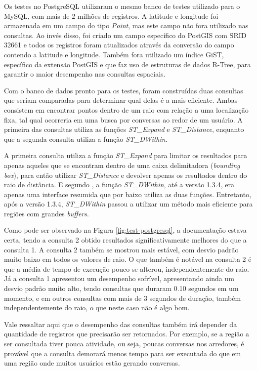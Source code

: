 \documentclass[diss]{template/setrem}
\begin{document}
Os testes no PostgreSQL utilizaram o mesmo banco de testes utilizado para o MySQL, com mais de 2 milhões de registros. A latitude e longitude foi armazenada em um campo do tipo \emph{Point}, mas este campo não fora utilizado nas consultas. Ao invés disso, foi criado um campo específico do PostGIS com SRID 32661 e todos os registros foram atualizados através da conversão do campo contendo a latitude e longitude. Também fora utilizado um índice GiST, específico da extensão PostGIS e que faz uso de estruturas de dados R-Tree, para garantir o maior desempenho nas consultas espaciais.

Com o banco de dados pronto para os testes, foram construídas duas consultas que seriam comparadas para determinar qual delas é a mais eficiente. Ambas consistem em encontrar pontos dentro de um raio com relação a uma localização fixa, tal qual ocorreria em uma busca por conversas ao redor de um usuário. A primeira das consultas utiliza as funções \emph{ST\_Expand} e \emph{ST\_Distance}, enquanto que a segunda consulta utiliza a função \emph{ST\_DWithin}.

A primeira consulta utiliza a função \emph{ST\_Expand} para limitar os resultados para apenas aqueles que se encontram dentro de uma caixa delimitadora (\emph{bounding box}), para então utilizar \emph{ST\_Distance} e devolver apenas os resultados dentro do raio de distância. E segundo \citet{PostGIS2012a}, a função \emph{ST\_DWithin}, até a versão 1.3.4, era apenas uma interface resumida que por baixo utiliza as duas funções. Entretanto, após a versão 1.3.4, \emph{ST\_DWithin} passou a utilizar um método mais eficiente para regiões com grandes \emph{buffers}.

Como pode ser observado na Figura \ref{fig:test-postgresql}, a documentação estava certa, tendo a consulta 2 obtido resultados significativamente melhores do que a consulta 1. A consulta 2 também se mostrou mais estável, com desvio padrão muito baixo em todos os valores de raio. O que também é notável na consulta 2 é que a média de tempo de execução pouco se alterou, independentemente do raio. Já a consulta 1 apresentou um desempenho sofrível, apresentando ainda um desvio padrão muito alto, tendo consultas que duraram 0.10 segundos em um momento, e em outros consultas com mais de 3 segundos de duração, também independentemente do raio, o que neste caso não é algo bom.

Vale ressaltar aqui que o desempenho das consultas também irá depender da quantidade de registros que precisarão ser retornados. Por exemplo, se a região a ser consultada tiver pouca atividade, ou seja, poucas conversas nos arredores, é provável que a consulta demorará menos tempo para ser executada do que em uma região onde muitos usuários estão gerando conversas.
\end{document}
